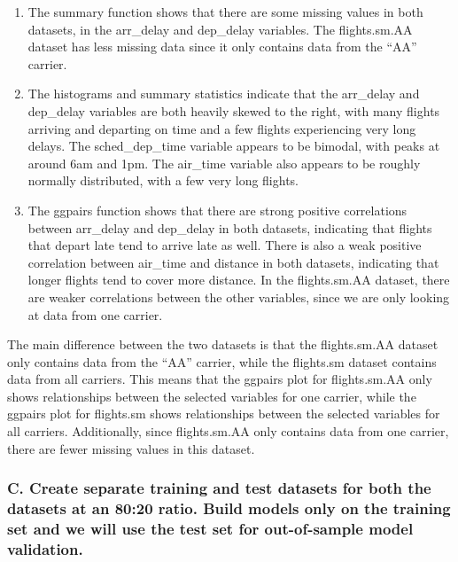 \documentclass[
]{article}
\begin{document}
\begin{enumerate}
\def\labelenumi{\roman{enumi})}
\item
  The summary function shows that there are some missing values in both
  datasets, in the arr\_delay and dep\_delay variables. The
  flights.sm.AA dataset has less missing data since it only contains
  data from the ``AA'' carrier.
\item
  The histograms and summary statistics indicate that the arr\_delay and
  dep\_delay variables are both heavily skewed to the right, with many
  flights arriving and departing on time and a few flights experiencing
  very long delays. The sched\_dep\_time variable appears to be bimodal,
  with peaks at around 6am and 1pm. The air\_time variable also appears
  to be roughly normally distributed, with a few very long flights.
\item
  The ggpairs function shows that there are strong positive correlations
  between arr\_delay and dep\_delay in both datasets, indicating that
  flights that depart late tend to arrive late as well. There is also a
  weak positive correlation between air\_time and distance in both
  datasets, indicating that longer flights tend to cover more distance.
  In the flights.sm.AA dataset, there are weaker correlations between
  the other variables, since we are only looking at data from one
  carrier.
\end{enumerate}

The main difference between the two datasets is that the flights.sm.AA
dataset only contains data from the ``AA'' carrier, while the flights.sm
dataset contains data from all carriers. This means that the ggpairs
plot for flights.sm.AA only shows relationships between the selected
variables for one carrier, while the ggpairs plot for flights.sm shows
relationships between the selected variables for all carriers.
Additionally, since flights.sm.AA only contains data from one carrier,
there are fewer missing values in this dataset.

\hypertarget{c.-create-separate-training-and-test-datasets-for-both-the-datasets-at-an-8020-ratio.-build-models-only-on-the-training-set-and-we-will-use-the-test-set-for-out-of-sample-model-validation.}{%
\subsubsection{C. Create separate training and test datasets for both
the datasets at an 80:20 ratio. Build models only on the training set
and we will use the test set for out-of-sample model
validation.}\label{c.-create-separate-training-and-test-datasets-for-both-the-datasets-at-an-8020-ratio.-build-models-only-on-the-training-set-and-we-will-use-the-test-set-for-out-of-sample-model-validation.}}
\end{document}
